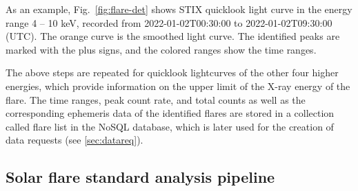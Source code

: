 \documentclass[referee]{aa} %
\begin{document}
As an example, Fig.~\ref{fig:flare-det} shows STIX quicklook light curve in the energy range 4 -- 10 keV, recorded from  2022-01-02T00:30:00 to 2022-01-02T09:30:00 (UTC).  The orange curve is the smoothed light curve.  The identified peaks are marked with the plus signs, and the colored ranges show the time ranges.

The above steps are repeated for quicklook lightcurves of the other four higher energies, which provide information on the upper limit of the X-ray energy of the flare. The time ranges, peak count rate, and total counts as well as the corresponding ephemeris data of the identified flares are  stored in a collection called flare list in the NoSQL database, which is later used for the creation of data requests (see \ref{sec:datareq}). 


\subsection{Solar flare standard analysis pipeline}
\end{document}
